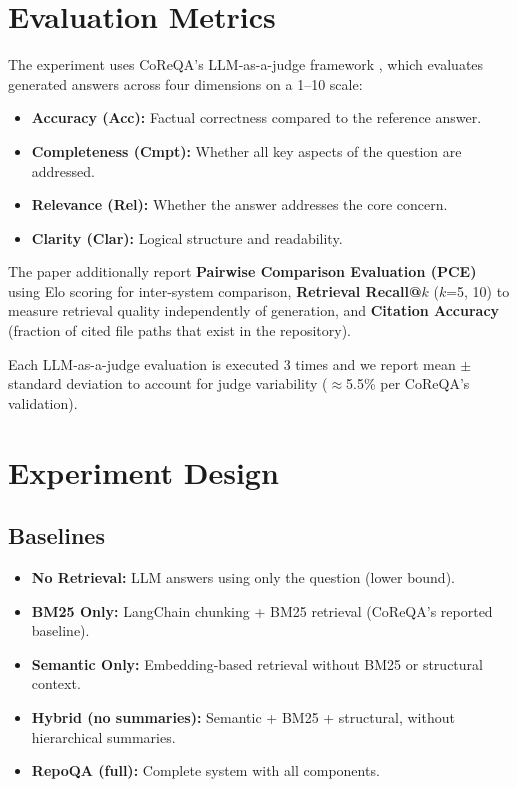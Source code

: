 \documentclass[11pt]{article}
\begin{document}
\section{Evaluation Metrics}

The experiment uses CoReQA's LLM-as-a-judge framework \citep{chen2025coreqa}, which evaluates generated answers across four dimensions on a 1--10 scale:

\begin{itemize}
    \item \textbf{Accuracy (Acc):} Factual correctness compared to the reference answer.
    \item \textbf{Completeness (Cmpt):} Whether all key aspects of the question are addressed.
    \item \textbf{Relevance (Rel):} Whether the answer addresses the core concern.
    \item \textbf{Clarity (Clar):} Logical structure and readability.
\end{itemize}

The paper additionally report \textbf{Pairwise Comparison Evaluation (PCE)} using Elo scoring for inter-system comparison, \textbf{Retrieval Recall@$k$} ($k$=5, 10) to measure retrieval quality independently of generation, and \textbf{Citation Accuracy} (fraction of cited file paths that exist in the repository).

Each LLM-as-a-judge evaluation is executed 3 times and we report mean $\pm$ standard deviation to account for judge variability ($\approx$5.5\% per CoReQA's validation).

\section{Experiment Design}

\subsection{Baselines}
\begin{itemize}
    \item \textbf{No Retrieval:} LLM answers using only the question (lower bound).
    \item \textbf{BM25 Only:} LangChain chunking + BM25 retrieval (CoReQA's reported baseline).
    \item \textbf{Semantic Only:} Embedding-based retrieval without BM25 or structural context.
    \item \textbf{Hybrid (no summaries):} Semantic + BM25 + structural, without hierarchical summaries.
    \item \textbf{RepoQA (full):} Complete system with all components.
\end{itemize}
\end{document}
